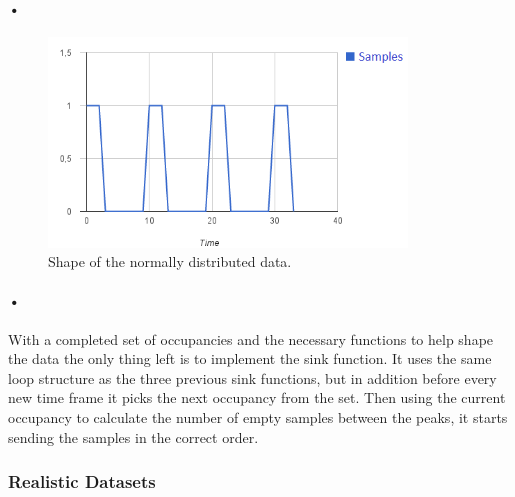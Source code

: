 \documentclass[a4paper, 12pt]{report}
\begin{document}
\paragraph{•}
\begin{figure}[h!]
	\centering
		\includegraphics[width=0.85\textwidth]{images/normal-data-shape.png}
		\caption{Shape of the normally distributed data.}
		\label{fig:normal-data-shape}
\end{figure}


\begin{minipage}{\linewidth}

\end{minipage}

\paragraph{•}
With a completed set of occupancies and the necessary functions to help shape the data the only thing left is to implement the sink function.
It uses the same loop structure as the three previous sink functions, but in addition before every new time frame it picks the next occupancy from the set.
Then using the current occupancy to calculate the number of empty samples between the peaks, it starts sending the samples in the correct order.

\subsubsection{Realistic Datasets}
\label{subsubsec:real-data}
\end{document}
